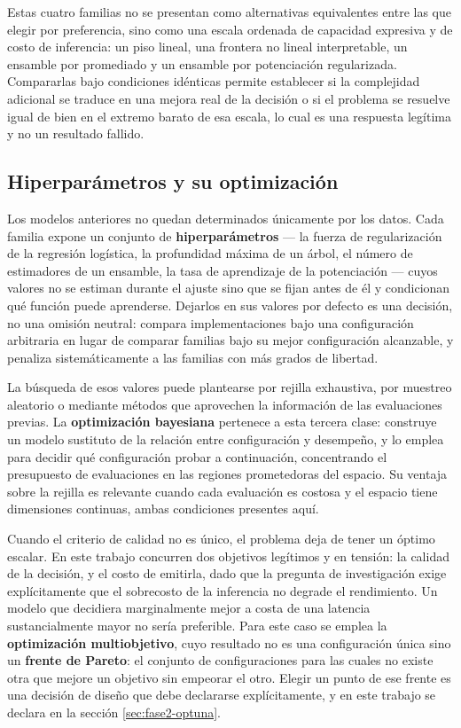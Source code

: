 \documentclass[12pt,oneside,spanish]{book}
\begin{document}
Estas cuatro familias no se presentan como alternativas equivalentes entre las que elegir por preferencia, sino como una escala ordenada de capacidad expresiva y de costo de inferencia: un piso lineal, una frontera no lineal interpretable, un ensamble por promediado y un ensamble por potenciación regularizada. Compararlas bajo condiciones idénticas permite establecer si la complejidad adicional se traduce en una mejora real de la decisión o si el problema se resuelve igual de bien en el extremo barato de esa escala, lo cual es una respuesta legítima y no un resultado fallido.

\subsection{Hiperparámetros y su optimización}
\label{sec:marco-hiperparametros}

Los modelos anteriores no quedan determinados únicamente por los datos. Cada familia expone un conjunto de \textbf{hiperparámetros} --- la fuerza de regularización de la regresión logística, la profundidad máxima de un árbol, el número de estimadores de un ensamble, la tasa de aprendizaje de la potenciación --- cuyos valores no se estiman durante el ajuste sino que se fijan antes de él y condicionan qué función puede aprenderse. Dejarlos en sus valores por defecto es una decisión, no una omisión neutral: compara implementaciones bajo una configuración arbitraria en lugar de comparar familias bajo su mejor configuración alcanzable, y penaliza sistemáticamente a las familias con más grados de libertad.

La búsqueda de esos valores puede plantearse por rejilla exhaustiva, por muestreo aleatorio o mediante métodos que aprovechen la información de las evaluaciones previas. La \textbf{optimización bayesiana} pertenece a esta tercera clase: construye un modelo sustituto de la relación entre configuración y desempeño, y lo emplea para decidir qué configuración probar a continuación, concentrando el presupuesto de evaluaciones en las regiones prometedoras del espacio. Su ventaja sobre la rejilla es relevante cuando cada evaluación es costosa y el espacio tiene dimensiones continuas, ambas condiciones presentes aquí.

Cuando el criterio de calidad no es único, el problema deja de tener un óptimo escalar. En este trabajo concurren dos objetivos legítimos y en tensión: la calidad de la decisión, y el costo de emitirla, dado que la pregunta de investigación exige explícitamente que el sobrecosto de la inferencia no degrade el rendimiento. Un modelo que decidiera marginalmente mejor a costa de una latencia sustancialmente mayor no sería preferible. Para este caso se emplea la \textbf{optimización multiobjetivo}, cuyo resultado no es una configuración única sino un \textbf{frente de Pareto}: el conjunto de configuraciones para las cuales no existe otra que mejore un objetivo sin empeorar el otro. Elegir un punto de ese frente es una decisión de diseño que debe declararse explícitamente, y en este trabajo se declara en la sección \ref{sec:fase2-optuna}.
\end{document}
